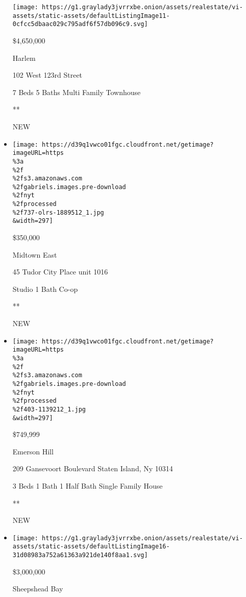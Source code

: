 \begin{itemize}
  \texttt{[image: https://g1.graylady3jvrrxbe.onion/assets/realestate/vi-assets/static-assets/defaultListingImage11-0cfcc5dbaac029c795adf6f57db096c9.svg]}

  \$4,650,000

  Harlem

  102 West 123rd Street

  7 Beds \textbar{} 5 Baths \textbar{} Multi Family Townhouse

  **

  NEW
\item
  \href{/real-estate/usa/ny/new-york/midtown-east/homes-for-sale/45-tudor-city-place/737-OLRS-1889512?}{}

  \texttt{[image: https://d39q1vwco01fgc.cloudfront.net/getimage?imageURL=https\\\%3a\\\%2f\\\%2fs3.amazonaws.com\\\%2fgabriels.images.pre-download\\\%2fnyt\\\%2fprocessed\\\%2f737-olrs-1889512\_1.jpg\\\&width=297]}

  \$350,000

  Midtown East

  45 Tudor City Place unit 1016

  Studio \textbar{} 1 Bath \textbar{} Co-op

  **

  NEW
\item
  \href{/real-estate/usa/ny/staten-island/emerson-hill/homes-for-sale/209-gansevoort-boulevard-staten-island-ny-10314/403-1139212?}{}

  \texttt{[image: https://d39q1vwco01fgc.cloudfront.net/getimage?imageURL=https\\\%3a\\\%2f\\\%2fs3.amazonaws.com\\\%2fgabriels.images.pre-download\\\%2fnyt\\\%2fprocessed\\\%2f403-1139212\_1.jpg\\\&width=297]}

  \$749,999

  Emerson Hill

  209 Gansevoort Boulevard Staten Island, Ny 10314

  3 Beds \textbar{} 1 Bath \textbar{} 1 Half Bath \textbar{} Single
  Family House

  **

  NEW
\item
  \href{/real-estate/usa/ny/brooklyn/sheepshead-bay/homes-for-sale/2310-jerome-avenue/13063-5538020?}{}

  \texttt{[image: https://g1.graylady3jvrrxbe.onion/assets/realestate/vi-assets/static-assets/defaultListingImage16-31d08983a752a61363a921de140f8aa1.svg]}

  \$3,000,000

  Sheepshead Bay


\end{itemize}
